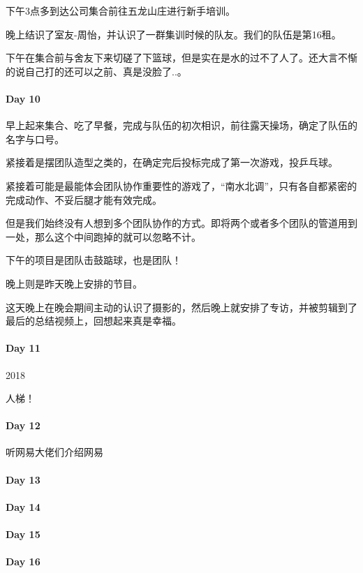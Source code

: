 \documentclass[UTF8,a4paper,8pt]{ctexart}
\begin{document}
		 下午3点多到达公司集合前往五龙山庄进行新手培训。
		 
		 晚上结识了室友-周怡，并认识了一群集训时候的队友。我们的队伍是第16租。
		 
		 下午在集合前与舍友下来切磋了下篮球，但是实在是水的过不了人了。还大言不惭的说自己打的还可以之前、真是没脸了..。
		 
 	 \paragraph{Day 10      \quad     }
	 	 早上起来集合、吃了早餐，完成与队伍的初次相识，前往露天操场，确定了队伍的名字与口号。
	 	 
	 	 紧接着是摆团队造型之类的，在确定完后投标完成了第一次游戏，投乒乓球。
	 	 
	 	 紧接着可能是最能体会团队协作重要性的游戏了，“南水北调”，只有各自都紧密的完成动作、不妥后腿才能有效完成。
	 	 
	 	 但是我们始终没有人想到多个团队协作的方式。即将两个或者多个团队的管道用到一处，那么这个中间跑掉的就可以忽略不计。
	 	 
	 	 下午的项目是团队击鼓踮球，也是团队！
	 	 
	 	 晚上则是昨天晚上安排的节目。
	 	 
	 	 这天晚上在晚会期间主动的认识了摄影的，然后晚上就安排了专访，并被剪辑到了最后的总结视频上，回想起来真是幸福。
 	 \paragraph{Day 11      \quad     }
	 	 2018
	 	 
	 	 人梯！
 	 
 	 \paragraph{Day 12      \quad     }
	 	 听网易大佬们介绍网易
	 	 
 	 \paragraph{Day 13      \quad     }
 	 \paragraph{Day 14      \quad     }
 	 \paragraph{Day 15      \quad     }
 	 \paragraph{Day 16      \quad     }
\end{document}
